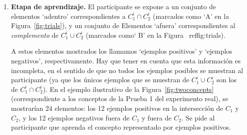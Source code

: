 \begin{enumerate}
    \item \label{item:LearningStage}{\bf Etapa de aprendizaje.} El participante se expone a un conjunto de elementos `adentro' correspondientes a $ C^i_1\cap C^i_2$ (marcados como `{\sf A}' en la Figura~\ref{fig:trials}), y un conjunto de Elementos `afuera' correspondientes al {\em complemento} de $C^i_1\cup C^i_2$ (marcados como` {\sf B}' en la Figura~ ref{fig:trials}).

    
	A estos elementos mostrados los llamamos `ejemplos positivos' y `ejemplos negativos', respectivamente. Hay que tener en cuenta que esta información es incompleta, en el sentido de que no todos los ejemplos posibles se muestran al participante (ya que los únicos ejemplos que se muestran de $C^i_1 \cup C^i_2$ son los de $C^i_1 \cap C^i_2$). En el ejemplo ilustrativo de la Figura~\ref{fig:twoconcepts} (correspondiente a los conceptos de la Prueba 1 del experimento real), se mostrarían 24 elementos: los 12 ejemplos positivos en la intersección de $C_1$ y $C_2$, y los 12 ejemplos negativos fuera de $C_1$ y fuera de $C_2$. Se pide al participante que aprenda el concepto representado por ejemplos positivos.


\end{enumerate}
